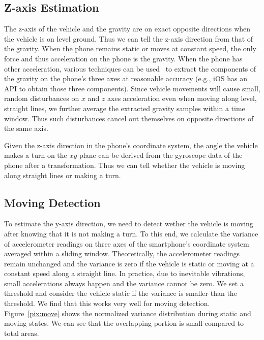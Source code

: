 \subsection{Z-axis Estimation}%
The z-axis of the vehicle and the gravity are on exact opposite directions when the vehicle is on level ground. Thus we can tell the z-axis direction from that of the gravity. When the phone remains static or moves at constant speed, the only force and thus acceleration on the phone is the gravity. When the phone has other acceleration, various techniques can be used~\cite{Wang:2013_Driver_Phone_Use} to extract the components of the gravity on the phone's three axes at reasonable accuracy (e.g., iOS has an API to obtain those three components). Since vehicle movements will cause small, random disturbances on $x$ and $z$ axes acceleration even when moving along level, straight lines, we further average the extracted gravity samples within a time window. Thus such disturbances cancel out themselves on opposite directions of the same axis.


Given the z-axis direction in the phone's coordinate system, the angle the vehicle makes a turn on the $xy$ plane can be derived from the gyroscope data of the phone after a transformation. Thus we can tell whether the vehicle is moving along straight lines or making a turn.


\subsection{Moving Detection}
To estimate the y-axis direction, we need to detect wether the vehicle is moving after knowing that it is not making a turn. To this end, we calculate the variance of accelerometer readings on three axes of the smartphone's coordinate system averaged within a sliding window. Theoretically, the accelerometer readings remain unchanged and the variance is zero if the vehicle is static or moving at a constant speed along a straight line. In practice, due to inevitable vibrations, small accelerations always happen and the variance cannot be zero.
We set a threshold and consider the vehicle static if the variance is smaller than the threshold. We find that this works very well for moving detection. Figure~\ref{pix:move} shows the normalized variance distribution during static and moving states. We can see that the overlapping portion is small compared to total areas.

